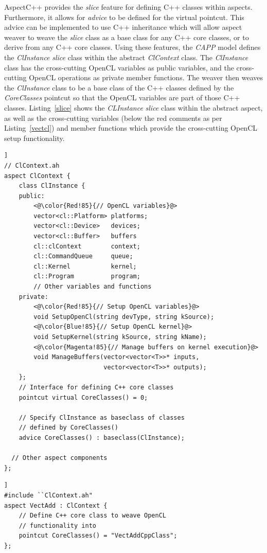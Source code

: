 \documentclass{sig-alternate-05-2015}
\begin{document}
AspectC++ provides the \textit{slice} feature for defining C++ classes within
aspects. Furthermore, it allows for \textit{advice} to be defined for the 
virtual pointcut. This advice can be implemented to use C++ inheritance which
will allow aspect weaver to weave the \textit{slice} class as a base class for 
any C++ core classes, or to derive from any C++ core classes. Using these features, the \textit{CAPP} model defines the 
\textit{ClInstance} \textit{slice} class within the abstract \textit{ClContext} class.  
The \textit{ClInstance} class has the cross-cutting OpenCL variables as public
variables, and the cross-cutting OpenCL operations as private member functions.
The weaver then weaves the \textit{ClInstance} class to be a base class of the C++
classes defined by the \textit{CoreClasses} pointcut so that the OpenCL variables 
are part of those C++ classes.
Listing~\ref{slice} shows the \textit{CLInstance} \textit{slice} class within the abstract aspect,
as well as the cross-cutting variables (below the red comments as per 
Listing~\ref{vectcl}) and member functions which provide the cross-cutting
OpenCL setup functionality.

\begin{lstlisting}[caption=Abstract ClContext aspect which defines the OpenCL variables
required for parallel programming,label=slice,float=[!t]]
// ClContext.ah
aspect ClContext {
	class ClInstance {
	public:
		<@\color{Red!85}{// OpenCL variables}@>
		vector<cl::Platform> platforms;
		vector<cl::Device>   devices;
		vector<cl::Buffer>   buffers
		cl::clContext        context;
		cl::CommandQueue     queue;
		cl::Kernel           kernel;
		cl::Program          program;
		// Other variables and functions 
	private:
		<@\color{Red!85}{// Setup OpenCL variables}@>
		void SetupOpenCl(string devType, string kSource);
		<@\color{Blue!85}{// Setup OpenCL kernel}@>
		void SetupKernel(string kSource, string kName);
		<@\color{Magenta!85}{// Manage buffers on kernel execution}@>
		void ManageBuffers(vector<vector<T>>* inputs,
		                   vector<vector<T>>* outputs);
	};
	// Interface for defining C++ core classes
	pointcut virtual CoreClasses() = 0;

	// Specify ClInstance as baseclass of classes
	// defined by CoreClasses()
	advice CoreClasses() : baseclass(ClInstance);

  // Other aspect components
};
\end{lstlisting}

\begin{lstlisting}[caption=Derived aspect defining the C++ core classes which
	require the OpenCL variables,label=dslice,float=[!t]]
#include ``ClContext.ah"
aspect VectAdd : ClContext {
	// Define C++ core class to weave OpenCL 
	// functionality into
	pointcut CoreClasses() = "VectAddCppClass";
};
\end{lstlisting}
\end{document}
